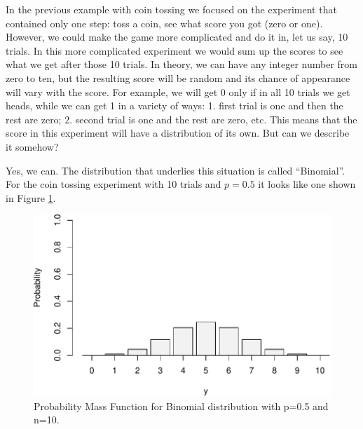 \documentclass[
]{book}
\theoremstyle{definition}
\theoremstyle{definition}
\theoremstyle{definition}
\theoremstyle{definition}
\theoremstyle{remark}
\begin{document}
In the previous example with coin tossing we focused on the experiment that contained only one step: toss a coin, see what score you got (zero or one). However, we could make the game more complicated and do it in, let us say, 10 trials. In this more complicated experiment we would sum up the scores to see what we get after those 10 trials. In theory, we can have any integer number from zero to ten, but the resulting score will be random and its chance of appearance will vary with the score. For example, we will get 0 only if in all 10 trials we get heads, while we can get 1 in a variety of ways: 1. first trial is one and then the rest are zero; 2. second trial is one and the rest are zero, etc. This means that the score in this experiment will have a distribution of its own. But can we describe it somehow?

Yes, we can. The distribution that underlies this situation is called ``Binomial''. For the coin tossing experiment with 10 trials and \(p=0.5\) it looks like one shown in Figure \ref{fig:binomialPMF05}.

\begin{figure}
\centering
\includegraphics{Svetunkov---Statistics-for-Business-Analytics_files/figure-latex/binomialPMF05-1.pdf}
\caption{\label{fig:binomialPMF05}Probability Mass Function for Binomial distribution with p=0.5 and n=10.}
\end{figure}
\end{document}

